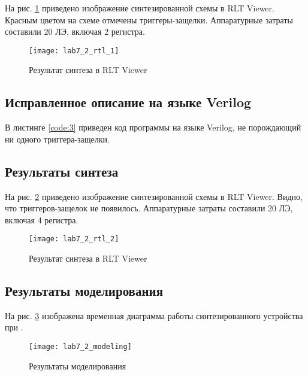 На рис. \ref{fig:lab7_2_rtl_1} приведено изображение синтезированной схемы в RLT Viewer. Красным цветом на схеме отмечены триггеры-защелки. Аппаратурные затраты составили 20 ЛЭ, включая 2 регистра.
\begin{figure}[H]
\begin{center}
	\texttt{[image: lab7\_2\_rtl\_1]}
	\caption{Результат синтеза в RLT Viewer}
	\label{fig:lab7_2_rtl_1}
\end{center}
\end{figure}

\subsection{Исправленное описание на языке Verilog}

В листинге \ref{code:3} приведен код программы на языке Verilog, не порождающий ни одного триггера-защелки.



\newpage

\subsection{Результаты синтеза}

На рис. \ref{fig:lab7_2_rtl} приведено изображение синтезированной схемы в RLT Viewer. Видно, что триггеров-защелок не появилось. Аппаратурные затраты составили 20 ЛЭ, включая 4 регистра.

\begin{figure}[H]
\begin{center}
	\texttt{[image: lab7\_2\_rtl\_2]}
	\caption{Результат синтеза в RLT Viewer}
	\label{fig:lab7_2_rtl}
\end{center}
\end{figure}

\newpage

\subsection{Результаты моделирования}
\label{sec:lab7_2_modeling}

На рис. \ref{fig:lab7_2_modeling} изображена временная диаграмма работы синтезированного устройства при .

\begin{figure}[H]
\begin{center}
	\texttt{[image: lab7\_2\_modeling]}
	\caption{Результаты моделирования}
	\label{fig:lab7_2_modeling}
\end{center}
\end{figure}

